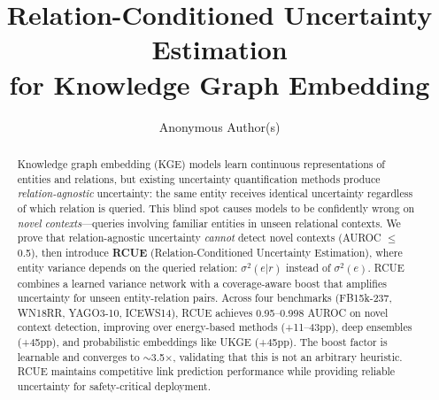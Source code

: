 \documentclass{article}
\title{Relation-Conditioned Uncertainty Estimation\\for Knowledge Graph Embedding}
\author{
  Anonymous Author(s)
}
\begin{document}
\maketitle

\begin{abstract}
Knowledge graph embedding (KGE) models learn continuous representations of entities and relations, but existing uncertainty quantification methods produce \emph{relation-agnostic} uncertainty: the same entity receives identical uncertainty regardless of which relation is queried. This blind spot causes models to be confidently wrong on \emph{novel contexts}---queries involving familiar entities in unseen relational contexts. We prove that relation-agnostic uncertainty \emph{cannot} detect novel contexts (AUROC $\leq$ 0.5), then introduce \textbf{RCUE} (Relation-Conditioned Uncertainty Estimation), where entity variance depends on the queried relation: $\sigma^2(e|r)$ instead of $\sigma^2(e)$. RCUE combines a learned variance network with a coverage-aware boost that amplifies uncertainty for unseen entity-relation pairs. Across four benchmarks (FB15k-237, WN18RR, YAGO3-10, ICEWS14), RCUE achieves 0.95--0.998 AUROC on novel context detection, improving over energy-based methods (+11--43pp), deep ensembles (+45pp), and probabilistic embeddings like UKGE (+45pp). The boost factor is learnable and converges to $\sim$3.5$\times$, validating that this is not an arbitrary heuristic. RCUE maintains competitive link prediction performance while providing reliable uncertainty for safety-critical deployment.
\end{abstract}











\appendix

\end{document}

